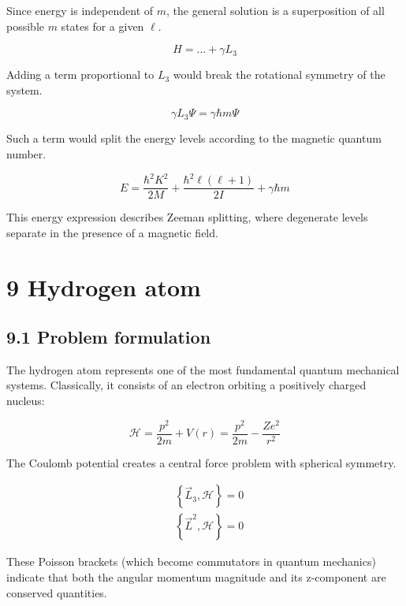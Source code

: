 \documentclass[10pt]{article}
\begin{document}
Since energy is independent of $m$, the general solution is a superposition of all possible $m$ states for a given $\ell$.

\begin{equation*}
H=\ldots+\gamma L_{3} \tag{8.80}
\end{equation*}

Adding a term proportional to $L_3$ would break the rotational symmetry of the system.

\begin{equation*}
\gamma L_{3} \Psi=\gamma \hbar m \Psi \tag{8.81}
\end{equation*}

Such a term would split the energy levels according to the magnetic quantum number.

\begin{equation*}
E=\frac{\hbar^{2} K^{2}}{2 M}+\frac{\hbar^{2} \ell(\ell+1)}{2 I}+\gamma \hbar m \tag{8.82}
\end{equation*}

This energy expression describes Zeeman splitting, where degenerate levels separate in the presence of a magnetic field.

\section*{9 Hydrogen atom}
\subsection*{9.1 Problem formulation}
The hydrogen atom represents one of the most fundamental quantum mechanical systems. Classically, it consists of an electron orbiting a positively charged nucleus:

\begin{equation*}
\mathcal{H}=\frac{p^{2}}{2 m}+V(r)=\frac{p^{2}}{2 m}-\frac{Z e^{2}}{r^{2}} \tag{9.1}
\end{equation*}

The Coulomb potential creates a central force problem with spherical symmetry.

\begin{align*}
& \left\{\vec{L}_{3}, \mathcal{H}\right\}=0 \\
& \left\{\vec{L}^{2}, \mathcal{H}\right\}=0 \tag{9.2}
\end{align*}

These Poisson brackets (which become commutators in quantum mechanics) indicate that both the angular momentum magnitude and its z-component are conserved quantities.
\end{document}
